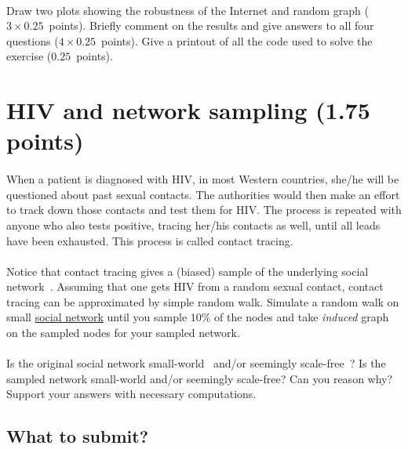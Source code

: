 \documentclass[11pt,a4paper]{article}
\newcommand{\points}[1]{({\color{magenta}$#1$~points})}
\newcommand{\totals}[1]{({\color{magenta}#1 points})}
\begin{document}
\paragraph{} Draw two plots showing the robustness of the Internet and random graph \points{3\times 0.25}. Briefly comment on the results and give answers to all four questions \points{4\times 0.25}. Give a printout of all the code used to solve the exercise \points{0.25}.

\section{HIV and network sampling \totals{1.75}}

\paragraph{} When a patient is diagnosed with HIV, in most Western countries, she/he will be questioned about past sexual contacts. The authorities would then make an effort to track down those contacts and test them for HIV. The process is repeated with anyone who also tests positive, tracing her/his contacts as well, until all leads have been exhausted. This process is called contact tracing. 

\paragraph{} Notice that contact tracing gives a (biased) sample of the underlying social network~\cite{LF06}. Assuming that one gets HIV from a random sexual contact, contact tracing can be approximated by simple random walk. Simulate a random walk on  small \href{http://lovro.lpt.fri.uni-lj.si/ina/nets/social}{social network} until you sample $10\%$ of the nodes and take {\it induced} graph on the sampled nodes for your sampled network. 

\paragraph{} Is the original social network small-world~\cite{WS98} and/or seemingly scale-free~\cite{BA99}? Is the sampled network small-world and/or seemingly scale-free? Can you reason why? Support your answers with necessary computations. 

\subsection*{What to submit?}
\end{document}
